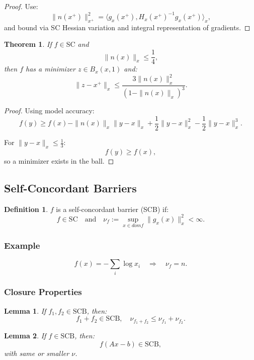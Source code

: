 \documentclass[12pt,oneside]{book}
\numberwithin{equation}{section}
\theoremstyle{definition}
\newtheorem{definition}{Definition}[section]
\theoremstyle{plain}
\newtheorem{theorem}{Theorem}[section]
\newtheorem{lemma}{Lemma}[section]
\theoremstyle{remark}
\begin{document}
\begin{proof}
Use:
\[
\|n(x^+)\|_{x^+}^2
=
\langle g_x(x^+), H_x(x^+)^{-1} g_x(x^+) \rangle_x,
\]
and bound via SC Hessian variation and integral representation of gradients.
\end{proof}

\begin{theorem}
If $f \in \mathrm{SC}$ and
\[
\|n(x)\|_x \le \frac{1}{4},
\]
then $f$ has a minimizer $z \in B_x(x,1)$ and:
\[
\|z - x^+\|_x
\le
\frac{3\|n(x)\|_x^2}{(1-\|n(x)\|_x)^3}.
\]
\end{theorem}

\begin{proof}
Using model accuracy:
\[
f(y) \ge f(x) - \|n(x)\|_x \|y-x\|_x + \frac{1}{2}\|y-x\|_x^2 - \frac{1}{2}\|y-x\|_x^3.
\]

For $\|y-x\|_x \le \tfrac{1}{3}$:
\[
f(y) \ge f(x),
\]
so a minimizer exists in the ball.
\end{proof}

\subsection{Self-Concordant Barriers}

\begin{definition}
$f$ is a self-concordant barrier (SCB) if:
\[
f \in \mathrm{SC}
\quad \text{and} \quad
\nu_f := \sup_{x \in dom f} \|g_x(x)\|_x^2 < \infty.
\]
\end{definition}

\subsubsection*{Example}

\[
f(x) = -\sum_i \log x_i
\quad \Rightarrow \quad
\nu_f = n.
\]

\subsubsection*{Closure Properties}

\begin{lemma}
If $f_1, f_2 \in \mathrm{SCB}$, then:
\[
f_1 + f_2 \in \mathrm{SCB},
\quad
\nu_{f_1+f_2} \le \nu_{f_1} + \nu_{f_2}.
\]
\end{lemma}

\begin{lemma}
If $f \in \mathrm{SCB}$, then:
\[
f(Ax-b) \in \mathrm{SCB},
\]
with same or smaller $\nu$.
\end{lemma}
\end{document}
